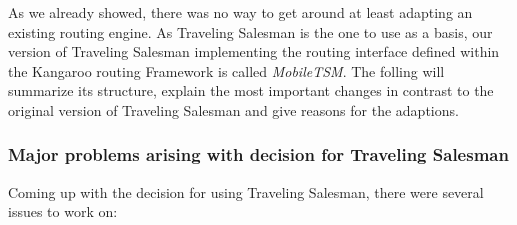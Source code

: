 As we already showed, there was no way to get around at least adapting an existing routing engine. As Traveling Salesman is the one to use as a basis, our version of Traveling Salesman implementing the routing interface defined within the Kangaroo routing Framework is called \emph{MobileTSM}. The folling will summarize its structure, explain the most important changes in contrast to the original version of Traveling Salesman and give reasons for the adaptions.

\subsubsection{Major problems arising with decision for Traveling Salesman}

Coming up with the decision for using Traveling Salesman, there were several issues to work on:


